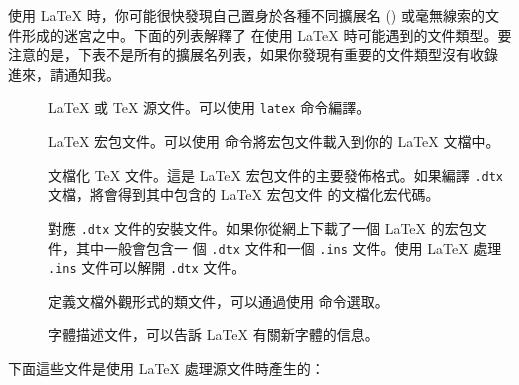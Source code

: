 使用 \LaTeX{} 時，你可能很快發現自己置身於各種不同擴展名 () 或毫無線索的文件形成的迷宮之中。下面的列表解釋了
在使用 \LaTeX{} 時可能遇到的文件類型。要注意的是，下表不是所有的擴展名列表，如果你發現有重要的文件類型沒有收錄
進來，請通知我。
%
\begin{description}

\item[]
  \LaTeX{} 或 \TeX{} 源文件。可以使用 \texttt{latex} 命令編譯。
\item[]
  \LaTeX{} 宏包文件。可以使用  命令將宏包文件載入到你的 \LaTeX{} 文檔中。
\item[]
  文檔化 \TeX{} 文件。這是 \LaTeX{} 宏包文件的主要發佈格式。如果編譯 \texttt{.dtx} 文檔，將會得到其中包含的 \LaTeX{} 宏包文件
  的文檔化宏代碼。
\item[] 對應 \texttt{.dtx} 文件的安裝文件。如果你從網上下載了一個 \LaTeX{} 的宏包文件，其中一般會包含一
  個 \texttt{.dtx} 文件和一個 \texttt{.ins} 文件。使用 \LaTeX{} 處理 \texttt{.ins} 文件可以解開 \texttt{.dtx} 文件。
\item[] 定義文檔外觀形式的類文件，可以通過使用  命令選取。
\item[] 字體描述文件，可以告訴 \LaTeX{} 有關新字體的信息。
\end{description}
下面這些文件是使用 \LaTeX{} 處理源文件時產生的：

